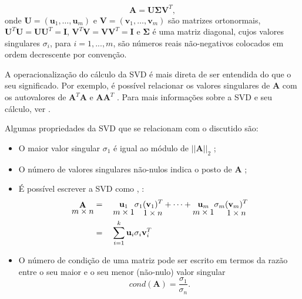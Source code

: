 \begin{equation}
\mathbf{A} = \mathbf{U} \mathbf{\Sigma} \mathbf{V}^T,
\label{eq:dsv3texto}
\end{equation}
onde $\mathbf{U} = (\mathbf{u}_1,\dots, \mathbf{u}_m)$ e $\mathbf{V} = (\mathbf{v}_1,\dots, \mathbf{v}_m)$ são matrizes ortonormais, $\mathbf{U}^T \mathbf{U} = \mathbf{U} \mathbf{U}^T = \mathbf{I} $, $\mathbf{V}^T \mathbf{V} = \mathbf{V} \mathbf{V}^T = \mathbf{I}$ e $ \mathbf{\Sigma}$ é uma matriz diagonal, cujos valores singulares $\sigma_i$, para $i = 1, ..., m$, são números reais não-negativos colocados em ordem decrescente por convenção. 

A operacionalização do cálculo da SVD é mais direta de ser entendida do que o seu significado. Por exemplo, é possível relacionar os valores singulares de $\mathbf{A}$ com os autovalores de $\mathbf{A}^T \mathbf{A}$ e $\mathbf{A} \mathbf{A}^T$ \cite[pág. 57]{aster2019parameter}. Para mais informações sobre a SVD e seu cálculo, ver \cite{golub2013matrix}.

Algumas propriedades da SVD que se relacionam com o discutido são:
\begin{itemize}
\item O maior valor singular $\sigma_1 $ é igual ao módulo de $\vert \vert \mathbf{A} \vert\vert_2$ \cite[corolário 2.4.3]{golub2013matrix};
\item O número de valores singulares não-nulos indica o posto de $\mathbf{A}$ \cite[corolário 2.4.6]{golub2013matrix};
\item É possível escrever a SVD como \cite[corolário 2.4.7]{golub2013matrix}, \cite[pág. 29]{hansen2010discrete}: 
\begin{equation}
\begin{aligned}
{\mathop{\mathbf{A}}_{\textstyle m \times n}} & = \quad {\mathop{\mathbf{u}_1}_{\textstyle m \times 1}} \sigma_1 {\mathop{(\mathbf{v}_1)^T}_{\textstyle 1 \times n}} + \dots + {\mathop{\mathbf{u}_m}_{\textstyle m \times 1}} \sigma_m {\mathop{(\mathbf{v}_m)^T}_{\textstyle 1 \times n}} \\
& = \quad \sum^k_{i=1} \mathbf{u}_i \sigma_i \mathbf{v}_i^T
\label{eq:dsv10}
\end{aligned}
\end{equation}
\item O número de condição de uma matriz pode ser escrito em termos da razão entre o seu maior e o seu menor (não-nulo) valor singular
\begin{equation}
cond(\mathbf{A}) = \frac{\sigma_1}{\sigma_n}. 
\label{eq:cond} 
\end{equation}
\end{itemize}



